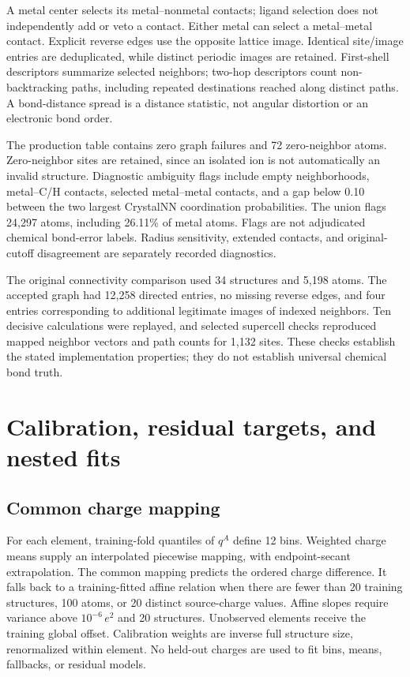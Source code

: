 \documentclass[11pt]{article}
\begin{document}
A metal center selects its metal--nonmetal contacts; ligand selection does not independently add or veto a contact. Either metal can select a metal--metal contact. Explicit reverse edges use the opposite lattice image. Identical site/image entries are deduplicated, while distinct periodic images are retained. First-shell descriptors summarize selected neighbors; two-hop descriptors count non-backtracking paths, including repeated destinations reached along distinct paths. A bond-distance spread is a distance statistic, not angular distortion or an electronic bond order.

The production table contains zero graph failures and 72 zero-neighbor atoms. Zero-neighbor sites are retained, since an isolated ion is not automatically an invalid structure. Diagnostic ambiguity flags include empty neighborhoods, metal--C/H contacts, selected metal--metal contacts, and a gap below 0.10 between the two largest CrystalNN coordination probabilities. The union flags 24,297 atoms, including 26.11\% of metal atoms. Flags are not adjudicated chemical bond-error labels. Radius sensitivity, extended contacts, and original-cutoff disagreement are separately recorded diagnostics.

The original connectivity comparison used 34 structures and 5,198 atoms. The accepted graph had 12,258 directed entries, no missing reverse edges, and four entries corresponding to additional legitimate images of indexed neighbors. Ten decisive calculations were replayed, and selected supercell checks reproduced mapped neighbor vectors and path counts for 1,132 sites. These checks establish the stated implementation properties; they do not establish universal chemical bond truth.

\section{Calibration, residual targets, and nested fits}
\subsection{Common charge mapping}
For each element, training-fold quantiles of $q^A$ define 12 bins. Weighted charge means supply an interpolated piecewise mapping, with endpoint-secant extrapolation. The common mapping predicts the ordered charge difference. It falls back to a training-fitted affine relation when there are fewer than 20 training structures, 100 atoms, or 20 distinct source-charge values. Affine slopes require variance above $10^{-6}\,e^2$ and 20 structures. Unobserved elements receive the training global offset. Calibration weights are inverse full structure size, renormalized within element. No held-out charges are used to fit bins, means, fallbacks, or residual models.
\end{document}

